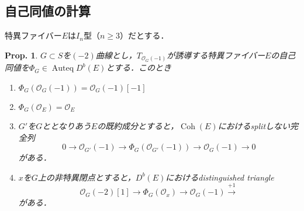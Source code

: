 \documentclass[uplatex,a4paper,11pt,dvipdfmx]{jsarticle}
\theoremstyle{mystyle} %
\newtheorem{proposition}{Prop.}[section]
\DeclareMathOperator{\Auteq}{Auteq}\DeclareMathOperator{\Coh}{Coh}
\DeclareMathOperator{\Ext}{Ext}
\begin{document}
\subsection{自己同値の計算}
特異ファイバー$E$は$I_n$型（$n\geq 3$）だとする．
\begin{proposition}
	$G \subset S$を$(-2)$曲線とし，$T_{\mathcal{O}_G(-1)}$が誘導する特異ファイバー$E$の自己同値を$\Phi_G \in \Auteq D^b(E)$とする．このとき
	\begin{enumerate}
		\item $\Phi_G(\mathcal{O}_G(-1)) = \mathcal{O}_G(-1)[-1]$
		\item $\Phi_G(\mathcal{O}_E) = \mathcal{O}_E$
		\item $G'$を$G$ととなりあう$E$の既約成分とすると，$\Coh(E)$におけるsplitしない完全列$$0 \to \mathcal{O}_{G'}(-1) \to \Phi_G(\mathcal{O}_{G'}(-1)) \to \mathcal{O}_G(-1) \to 0$$がある．
		\item $x$を$G$上の非特異閉点とすると，$D^b(E)$におけるdistinguished triangle$$\mathcal{O}_G(-2)[1]\to \Phi_G(\mathcal{O}_x)\to \mathcal{O}_G(-1) \xrightarrow{+1} $$がある．
	\end{enumerate}
\end{proposition}
\end{document}

